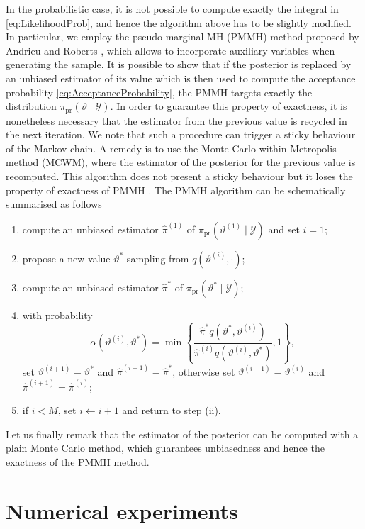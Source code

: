 \documentclass{siamart1116}
\numberwithin{theorem}{section}
\renewcommand{\theta}{\vartheta}
\begin{document}
In the probabilistic case, it is not possible to compute exactly the integral in \eqref{eq:LikelihoodProb}, and hence the algorithm above has to be slightly modified. In particular, we employ the pseudo-marginal MH (PMMH) method proposed by Andrieu and Roberts \cite{AnR09}, which allows to incorporate auxiliary variables when generating the sample. It is possible to show that if the posterior is replaced by an unbiased estimator of its value which is then used to compute the acceptance probability \eqref{eq:AcceptanceProbability}, the PMMH targets exactly the distribution $\pi_{\mathrm{pr}}(\theta \mid \mathcal{Y})$. In order to guarantee this property of exactness, it is nonetheless necessary that the estimator from the previous value is recycled in the next iteration. We note that such a procedure can trigger a sticky behaviour of the Markov chain. A remedy is to use the Monte Carlo within Metropolis method (MCWM), where the estimator of the posterior for the previous value is recomputed. This algorithm does not present a sticky behaviour but it loses the property of exactness of PMMH \cite{MLR16}. The PMMH algorithm can be schematically summarised as follows
\begin{enumerate}
	\item compute an unbiased estimator $\hat{\pi}^{(1)}$ of $\pi_{\mathrm{pr}}(\theta^{(1)}\mid \mathcal{Y})$ and set $i = 1$;
	\item propose a new value $\theta^*$ sampling from $q(\theta^{(i)}, \cdot)$;
	\item compute an unbiased estimator $\hat{\pi}^*$ of $\pi_{\mathrm{pr}}(\theta^*\mid\mathcal{Y})$;
	\item with probability 
		\begin{equation}\label{eq:AcceptanceProbabilityProb}
			\alpha(\theta^{(i)}, \theta^*) = \min\left\{\frac{\hat{\pi}^* q(\theta^*, \theta^{(i)})}{\hat{\pi}^{(i)}q(\theta^{(i)}, \theta^*)}, 1\right\},
		\end{equation}
	set $\theta^{(i+1)} = \theta^*$ and $\hat{\pi}^{(i+1)} = \hat{\pi}^*$, otherwise set $\theta^{(i+1)} = \theta^{(i)}$ and $\hat{\pi}^{(i+1)} = \hat{\pi}^{(i)}$;
	\item if $i < M$, set $i \leftarrow i + 1$ and return to step (ii).
\end{enumerate}
Let us finally remark that the estimator of the posterior can be computed with a plain Monte Carlo method, which guarantees unbiasedness and hence the exactness of the PMMH method.

\section{Numerical experiments}\label{sec:NumericalExperiments}
\end{document}

